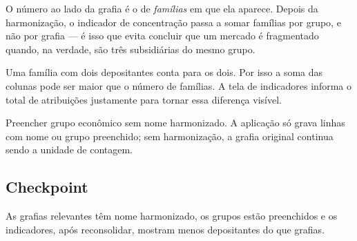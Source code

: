 O número ao lado da grafia é o de \emph{famílias} em que ela aparece. Depois da harmonização, o
indicador de concentração passa a somar famílias por grupo, e não por grafia --- é isso que evita
concluir que um mercado é fragmentado quando, na verdade, são três subsidiárias do mesmo grupo.

\begin{nota}
Uma família com dois depositantes conta para os dois. Por isso a soma das colunas pode ser maior que o
número de famílias. A tela de indicadores informa o total de atribuições justamente para tornar essa
diferença visível.
\end{nota}

\begin{alerta}
Preencher grupo econômico sem nome harmonizado. A aplicação só grava linhas com nome ou grupo
preenchido; sem harmonização, a grafia original continua sendo a unidade de contagem.
\end{alerta}

\subsection*{Checkpoint}
\marcador\; As grafias relevantes têm nome harmonizado, os grupos estão preenchidos e os indicadores, após
reconsolidar, mostram menos depositantes do que grafias.
